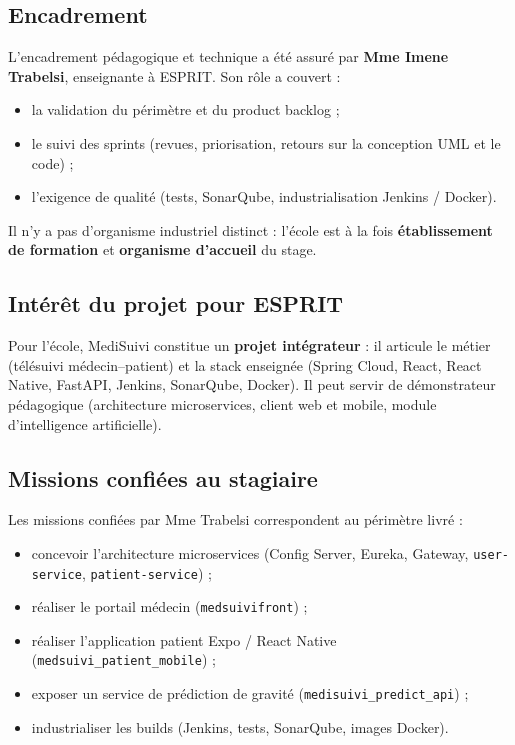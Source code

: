 \documentclass[12pt,a4paper,oneside]{report}
\begin{document}
\subsection{Encadrement}
L'encadrement pédagogique et technique a été assuré par \textbf{Mme Imene Trabelsi}, enseignante à ESPRIT. Son rôle a couvert :
\begin{itemize}[leftmargin=1.4em]
  \item la validation du périmètre et du product backlog ;
  \item le suivi des sprints (revues, priorisation, retours sur la conception UML et le code) ;
  \item l'exigence de qualité (tests, SonarQube, industrialisation Jenkins / Docker).
\end{itemize}
Il n'y a pas d'organisme industriel distinct : l'école est à la fois \textbf{établissement de formation} et \textbf{organisme d'accueil} du stage.

\subsection{Intérêt du projet pour ESPRIT}
Pour l'école, MediSuivi constitue un \textbf{projet intégrateur} : il articule le métier (télésuivi médecin--patient) et la stack enseignée (Spring Cloud, React, React Native, FastAPI, Jenkins, SonarQube, Docker). Il peut servir de démonstrateur pédagogique (architecture microservices, client web et mobile, module d'intelligence artificielle).

\subsection{Missions confiées au stagiaire}
Les missions confiées par Mme Trabelsi correspondent au périmètre livré :
\begin{itemize}[leftmargin=1.4em]
  \item concevoir l'architecture microservices (Config Server, Eureka, Gateway, \texttt{user-service}, \texttt{patient-service}) ;
  \item réaliser le portail médecin (\texttt{medsuivifront}) ;
  \item réaliser l'application patient Expo / React Native (\texttt{medsuivi\_patient\_mobile}) ;
  \item exposer un service de prédiction de gravité (\texttt{medisuivi\_predict\_api}) ;
  \item industrialiser les builds (Jenkins, tests, SonarQube, images Docker).
\end{itemize}
\end{document}

